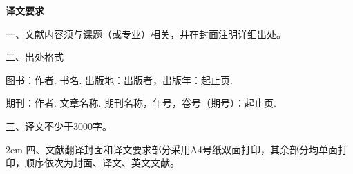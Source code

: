 \thispagestyle{empty}

\vspace*{1em}

\centerline{\linespread{1.3}\bfseries 译文要求}

\vspace*{1em}

\begin{flushleft}

    \linespread{1.6}

    \noindent
    一、文献内容须与课题（或专业）相关，并在封面注明详细出处。

    \noindent
    二、出处格式

    \setlength{\parindent}{2em}
    图书：作者. 书名. 出版地：出版者，出版年：起止页.

    期刊：作者. 文章名称. 期刊名称，年号，卷号（期号）：起止页.

    \noindent
    三、译文不少于3000字。

    \noindent
    \hangindent 2em
    四、文献翻译封面和译文要求部分采用A4号纸双面打印，其余部分均单面打印，顺序依次为封面、译文、英文文献。
    
\end{flushleft}





